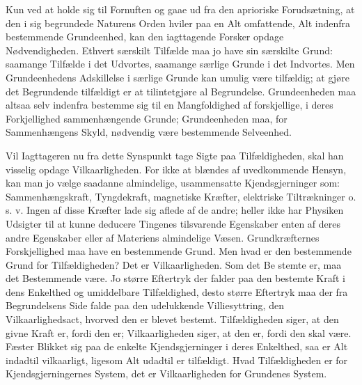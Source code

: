 \documentclass[12pt,a4paper]{book}
\begin{document}
Kun ved at holde sig til Fornuften og gaae ud fra den
aprioriske Forudsætning, at den i sig begrundede Naturens Orden
hviler paa en Alt omfattende, Alt indenfra bestemmende
Grundeenhed, kan den iagttagende Forsker opdage Nødvendigheden.
Ethvert særskilt Tilfælde maa jo have sin særskilte Grund:
saamange Tilfælde i det Udvortes, saamange særlige Grunde i det
Indvortes. Men Grundeenhedens Adskillelse i særlige Grunde kan
umulig være tilfældig; at gjøre det Begrundende tilfældigt er at
tilintetgjøre al Begrundelse. Grundeenheden maa altsaa selv
indenfra bestemme sig til en Mangfoldighed af forskjellige, i deres
Forkjellighed sammenhængende Grunde; Grundeenheden maa, for
Sammenhængens Skyld, nødvendig være bestemmende Selveenhed.

Vil Iagttageren nu fra dette Synspunkt tage Sigte paa
Tilfældigheden, skal han visselig opdage Vilkaarligheden. For ikke
at blændes af uvedkommende Hensyn, kan man jo vælge saadanne
almindelige, usammensatte Kjendsgjerninger som:
Sammenhængskraft, Tyngdekraft, magnetiske Kræfter, elektriske
Tiltrækninger o. s. v. Ingen af disse Kræfter lade sig aflede af de andre;
heller ikke har Physiken Udsigter til at kunne deducere Tingenes
tilsvarende Egenskaber enten af deres andre Egenskaber eller af
Materiens almindelige Væsen. Grundkræfternes Forskjellighed maa
have en bestemmende Grund. Men hvad er den bestemmende
Grund for Tilfældigheden? Det er Vilkaarligheden. Som det Be\-%
stemte er, maa det Bestemmende være. Jo større Eftertryk der
falder paa den bestemte Kraft i dens Enkelthed og umiddelbare
Tilfældighed, desto større Eftertryk maa der fra Begrundelsens
Side falde paa den udelukkende Villiesyttring, den
Vilkaarlighedsact, hvorved den er blevet bestemt. Tilfældigheden siger, at
den givne Kraft er, fordi den er; Vilkaarligheden siger, at den er,
fordi den skal være. Fæster Blikket sig paa de enkelte
Kjendsgjerninger i deres Enkelthed, saa er Alt indadtil vilkaarligt,
ligesom Alt udadtil er tilfældigt. Hvad Tilfældigheden er for
Kjendsgjerningernes System, det er Vilkaarligheden for Grundenes
System.
\end{document}
